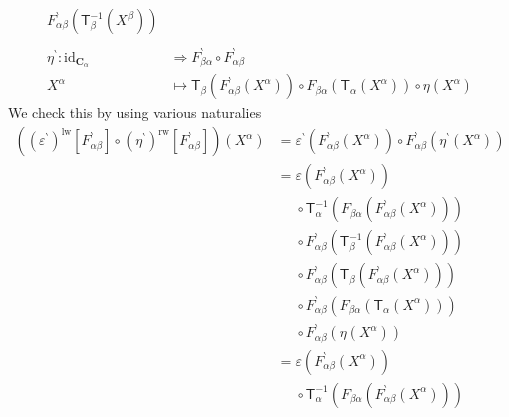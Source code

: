 \begin{prf}
\begin{enumerate}
\begin{align*}
  F_{\alpha\beta}^{\backprime}
  \left(
    \mathsf{T}_{\beta}^{-1}(X^{\beta})
  \right)
  \\\\
  \eta^{\backprime}
  \colon
  \mathrm{id}_{\mathbf{C}_{\alpha}}
  &\Rightarrow
  F_{\beta\alpha}^{\backprime}
  \circ
  F_{\alpha\beta}^{\backprime}
  \\
  X^{\alpha}
  &\mapsto
  \mathsf{T}_{\beta}
  \left(
    F_{\alpha\beta}^{\backprime}(X^{\alpha})
  \right)
  \circ
  F_{\beta\alpha}
  \left(
    \mathsf{T}_{\alpha}(X^{\alpha})
  \right)
  \circ
  \eta(X^{\alpha})
\end{align*}
We check this by using various naturalies
\begin{align*}
  \left(
    (\varepsilon^{\backprime})^{\textrm{lw}}[F_{\alpha\beta}^{\backprime}]
    \circ
    (\eta^{\backprime})^{\textrm{rw}}[F_{\alpha\beta}^{\backprime}]
  \right)
  (X^{\alpha})
  &=
  \varepsilon^{\backprime}
  \left(
    F_{\alpha\beta}^{\backprime}(X^{\alpha})
  \right)
  \circ
  F_{\alpha\beta}^{\backprime}
  \left(
    \eta^{\backprime}(X^{\alpha})
  \right)
  \\
  &=
  \varepsilon
  \left(
    F_{\alpha\beta}^{\backprime}(X^{\alpha})
  \right)
  \\
  &\phantom{=}
  \circ
  \mathsf{T}_{\alpha}^{-1}
  \left(
    F_{\beta\alpha}
    \left(
      F_{\alpha\beta}^{\backprime}(X^{\alpha})
    \right)
  \right)
  \\
  &\phantom{=}
  \circ
  F_{\alpha\beta}^{\backprime}
  \left(
    \mathsf{T}_{\beta}^{-1}
    \left(
      F_{\alpha\beta}^{\backprime}(X^{\alpha})
    \right)
  \right)
  \\
  &\phantom{=}
  \circ
  F_{\alpha\beta}^{\backprime}
  \left(
    \mathsf{T}_{\beta}
    \left(
      F_{\alpha\beta}^{\backprime}(X^{\alpha})
    \right)
  \right)
  \\
  &\phantom{=}
  \circ
  F_{\alpha\beta}^{\backprime}
  \left(
    F_{\beta\alpha}
    \left(
      \mathsf{T}_{\alpha}(X^{\alpha})
    \right)
  \right)
  \\
  &\phantom{=}
  \circ
  F_{\alpha\beta}^{\backprime}
  \left(
    \eta(X^{\alpha})
  \right)
  \\
  &=
  \varepsilon
  \left(
    F_{\alpha\beta}^{\backprime}(X^{\alpha})
  \right)
  \\
  &\phantom{=}
  \circ
  \mathsf{T}_{\alpha}^{-1}
  \left(
    F_{\beta\alpha}
    \left(
      F_{\alpha\beta}^{\backprime}(X^{\alpha})
    \right)
  \right)
  \\
  &\phantom{=}

\end{align*}
\end{enumerate}
\end{prf}
